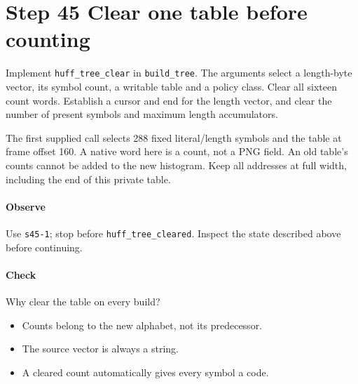 \section{Step 45 Clear one table before counting}\label{png-huff-s45}
Implement \texttt{huff\_tree\_clear} in \texttt{build\_tree}. The arguments select a length-byte vector, its symbol count, a writable table and a policy class. Clear all sixteen count words. Establish a cursor and end for the length vector, and clear the number of present symbols and maximum length accumulators.

The first supplied call selects 288 fixed literal/length symbols and the table at frame offset 160. A native word here is a count, not a PNG field. An old table's counts cannot be added to the new histogram. Keep all addresses at full width, including the end of this private table.

\paragraph{Observe} Use \texttt{s45-1}; stop before \texttt{huff\_tree\_cleared}. Inspect the state described above before continuing.

\paragraph{Check} Why clear the table on every build?
\begin{itemize}
  \item[A.] Counts belong to the new alphabet, not its predecessor.
  \item[B.] The source vector is always a string.
  \item[C.] A cleared count automatically gives every symbol a code.
\end{itemize}
